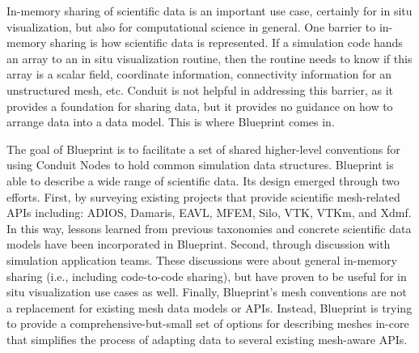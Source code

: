
%
In-memory sharing of scientific data is an important use case,
certainly for in situ visualization, but also for computational science in general.
%
One barrier to in-memory sharing is how scientific data is represented.
%
If a simulation code hands an array to an in situ visualization routine, then the routine
needs to know if this array is a scalar field, coordinate information, connectivity information
for an unstructured mesh, etc.
%
Conduit is not helpful in addressing this barrier,
as it provides a foundation for sharing data, but it provides no guidance on
how to arrange
data into a data model.
%
This is where Blueprint comes in.
%
%


The goal of Blueprint is to facilitate a set of shared higher-level
conventions for using Conduit Nodes to hold common simulation data structures.
%
Blueprint is able to describe a wide range of scientific data.
%
Its design emerged through two efforts.
%
First, by surveying existing
projects that provide scientific mesh-related APIs including: ADIOS, Damaris,
EAVL, MFEM, Silo, VTK, VTKm, and Xdmf.
%
In this way, lessons learned from previous taxonomies and concrete scientific data models
have been incorporated in Blueprint.
%
Second, through discussion with simulation application teams.
%
These discussions were about general in-memory sharing (i.e., including code-to-code sharing),
but have proven to be useful for in situ visualization use cases as well.
%
Finally,
Blueprint's mesh conventions are not a replacement for existing mesh data models or APIs.
%
Instead, Blueprint is trying to provide a comprehensive-but-small set of options for
describing meshes in-core that simplifies
the process of adapting data to several existing mesh-aware APIs.



%
%

